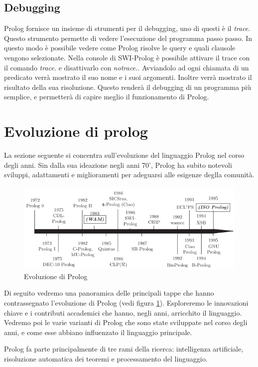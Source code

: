 \subsection{Debugging}
\label{subsec:debugging}
Prolog fornisce un insieme di strumenti per il debugging, uno di questi è il \textit{trace}. Questo strumento permette di vedere l'esecuzione del programma passo passo. 
In questo modo è possibile vedere come Prolog risolve le query e quali clausole vengono selezionate. Nella console di SWI-Prolog è possibile attivare il trace con il comando \textit{trace.} e disattivarlo con \textit{notrace.}.
Avviandolo ad ogni chiamata di un predicato verrà mostrato il suo nome e i suoi argomenti. Inoltre verrà mostrato il risultato della sua risoluzione. Questo renderà il debugging di un programma più semplice, e permetterà di capire meglio il funzionamento di Prolog.
\section{Evoluzione di prolog}
\label{sec:evoluzione}
La sezione seguente si concentra sull'evoluzione del linguaggio Prolog nel corso degli anni. Sin dalla sua ideazione negli anni 70', Prolog ha subito notevoli sviluppi, adattamenti e miglioramenti per adeguarsi
alle esigenze deglla comunità.
\begin{figure}[h!]
    \centering
    \includegraphics[scale=0.5]{images/prologhist.png}
    \caption{Evoluzione di Prolog \cite{korner2022fifty}}
    \label{fig:prologhist}
\end{figure}

Di seguito vedremo una panoramica delle principali tappe che hanno contrassegnato l'evoluzione di Prolog (vedi figura \ref{fig:prologhist}). Esploreremo le innovazioni chiave e i contributi accademici
che hanno, negli anni, arricchito il linguaggio. Vedremo poi le varie varianti di Prolog che sono state sviluppate nel corso degli anni, e come esse abbiano influenzato
il linguaggio principale.

Prolog fa parte principalmente di tre rami della ricerca: intelligenza artificiale, risoluzione automatica dei teoremi e processamento del linguaggio.

